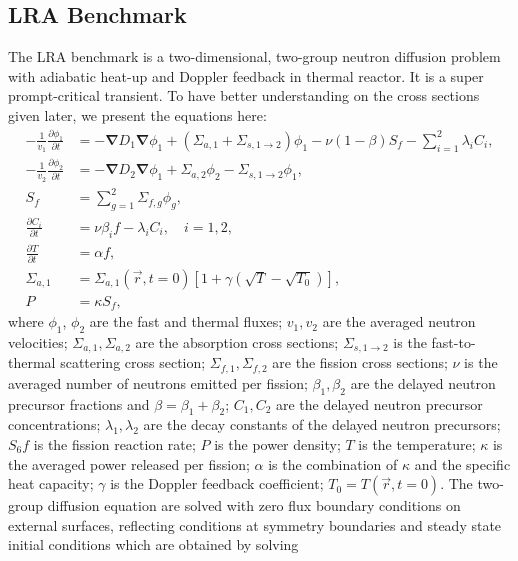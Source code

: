 \documentclass[10pt]{scrartcl}
\newcommand{\grad}{\bs{\nabla}}
\newcommand{\bs}[1]{\mathbf{#1}}
\begin{document}
\newpage

\subsection{LRA Benchmark}

The LRA benchmark is a two-dimensional, two-group neutron diffusion problem with adiabatic heat-up and Doppler feedback in thermal reactor.  It is a super prompt-critical transient.  To have better understanding on the cross sections given later, we present the equations here:
\begin{align}
-\frac{1}{v_1} \frac{\partial \phi_1}{\partial t} &= -\grad D_1 \grad\phi_1 + (\Sigma_{a,1} + \Sigma_{s, 1\rightarrow 2})\phi_1 - \nu(1-\beta)S_f  - \sum_{i=1}^2 \lambda_i C_i, \\
-\frac{1}{v_2} \frac{\partial \phi_2}{\partial t} &= -\grad D_2 \grad\phi_1 + \Sigma_{a,2}\phi_2 - \Sigma_{s, 1\rightarrow 2}\phi_1, \\
S_f &= \sum_{g=1}^2 \Sigma_{f,g} \phi_g, \\
\frac{\partial C_i}{\partial t} &= \nu\beta_i f - \lambda_i C_i, \quad i=1,2, \\
\frac{\partial T}{\partial t} &= \alpha f, \label{eq:lra-temp} \\
\Sigma_{a,1} &= \Sigma_{a,1}(\vec{r}, t=0) \left[1+\gamma\left(\sqrt{T} - \sqrt{T_0}\right)\right], \\
P &= \kappa S_f,
\end{align}
where $\phi_1$, $\phi_2$ are the fast and thermal fluxes; $v_1, v_2$ are the averaged neutron velocities; $\Sigma_{a,1}, \Sigma_{a,2}$ are the absorption cross sections; $\Sigma_{s,1\rightarrow 2}$ is the fast-to-thermal scattering cross section; $\Sigma_{f,1}, \Sigma_{f,2}$ are the fission cross sections; $\nu$ is the averaged number of neutrons emitted per fission; $\beta_1, \beta_2$ are the delayed neutron precursor fractions and $\beta=\beta_1 + \beta_2$; $C_1, C_2$ are the delayed neutron precursor concentrations; $\lambda_1, \lambda_2$ are the decay constants of the delayed neutron precursors; $S_6f$ is the fission reaction rate; $P$ is the power density; $T$ is the temperature; $\kappa$ is the averaged power released per fission; $\alpha$ is the combination of $\kappa$ and the specific heat capacity; $\gamma$ is the Doppler feedback coefficient; $T_0=T(\vec{r}, t=0)$.
The two-group diffusion equation are solved with zero flux boundary conditions on external surfaces, reflecting conditions at symmetry boundaries and steady state initial conditions which are obtained by solving
\end{document}
